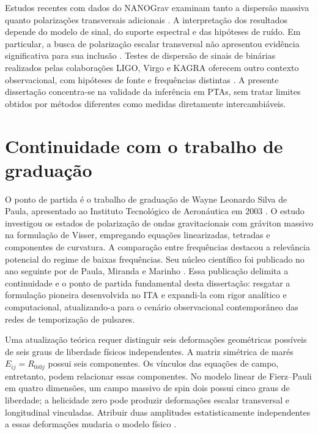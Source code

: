 Estudos recentes com dados do NANOGrav examinam tanto a dispersão massiva
quanto polarizações transversais adicionais
\autocite{wu2024,nanograv2024}. A interpretação dos resultados depende do
modelo de sinal, do suporte espectral e das hipóteses de ruído. Em
particular, a busca de polarização escalar transversal não apresentou
evidência significativa para sua inclusão \autocite{nanograv2024}.
Testes de dispersão de sinais de binárias realizados pelas colaborações
LIGO, Virgo e KAGRA oferecem outro contexto observacional, com hipóteses
de fonte e frequências distintas \autocite{lvk2026}. A presente
dissertação concentra-se na validade da inferência em PTAs, sem tratar
limites obtidos por métodos diferentes como medidas diretamente
intercambiáveis.

\section{Continuidade com o trabalho de graduação}

O ponto de partida é o trabalho de graduação de Wayne Leonardo Silva de
Paula, apresentado ao Instituto Tecnológico de Aeronáutica em 2003
\autocite{tg2003}. O estudo investigou os estados de polarização de ondas
gravitacionais com gráviton massivo na formulação de Visser,
empregando equações linearizadas, tetradas e componentes de curvatura.
A comparação entre frequências destacou a relevância potencial do
regime de baixas frequências. Seu núcleo científico foi publicado no
ano seguinte por de Paula, Miranda e Marinho
\autocite{depaula2004}. Essa publicação delimita a continuidade e o ponto
de partida fundamental desta dissertação: resgatar a formulação pioneira
desenvolvida no ITA e expandi-la com rigor analítico e computacional,
atualizando-a para o cenário observacional contemporâneo das redes de
temporização de pulsares.

Uma atualização teórica requer distinguir seis deformações geométricas
possíveis de seis graus de liberdade físicos independentes. A matriz
simétrica de marés \(E_{ij}=R_{0i0j}\) possui seis componentes. Os
vínculos das equações de campo, entretanto, podem relacionar essas
componentes. No modelo linear de Fierz--Pauli em quatro dimensões, um
campo massivo de spin dois possui cinco graus de liberdade; a
helicidade zero pode produzir deformações escalar transversal e
longitudinal vinculadas. Atribuir duas amplitudes estatisticamente
independentes a essas deformações mudaria o modelo físico
\autocite{liang2021}.

